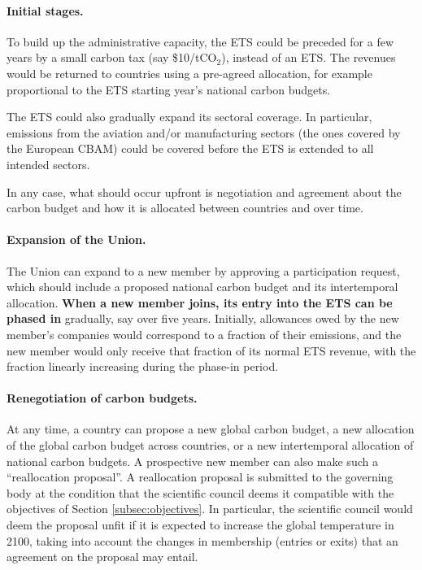 \documentclass[12pt,english]{article}
\begin{document}
\paragraph{Initial stages.}

To build up the administrative capacity, the ETS could be preceded for a few years by a small carbon tax (say \$10/tCO$_\text{2}$), instead of an ETS. The revenues would be returned to countries using a pre-agreed allocation, for example proportional to the ETS starting year's national carbon budgets.

The ETS could also gradually expand its sectoral coverage. In particular, emissions from the aviation and/or manufacturing sectors (the ones covered by the European CBAM) could be covered before the ETS is extended to all intended sectors.

In any case, what should occur upfront is negotiation and agreement about the
carbon budget and how it is allocated between countries and over time.

\paragraph{Expansion of the Union.}
The Union can expand to a new member by approving a participation request, which should include a proposed national carbon budget and its intertemporal allocation. \textbf{When a new member joins, its entry into the ETS can be phased in} gradually, say over five years. Initially, allowances owed by the new member's companies would correspond to a fraction of their emissions, and the new member would only receive that fraction of its normal ETS revenue, with the fraction linearly increasing during the phase-in period. 

\paragraph{Renegotiation of carbon budgets.}
At any time, a country can propose a new global carbon budget, a new allocation of the global carbon budget across countries, or a new intertemporal allocation of national carbon budgets. A prospective new member can also make such a ``reallocation proposal''. A reallocation proposal is submitted to the governing body at the condition that the scientific council deems it compatible with the objectives of Section \ref{subsec:objectives}. In particular, the scientific council would deem the proposal unfit if it is expected to increase the global temperature in 2100, taking into account the changes in membership (entries or exits) that an agreement on the proposal may entail.
\end{document}

